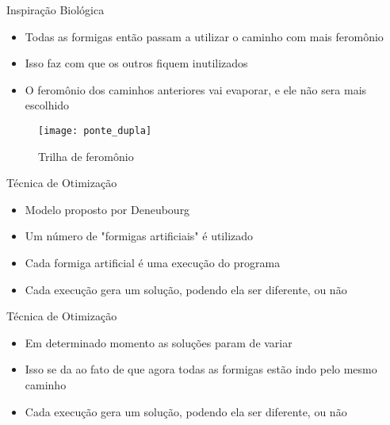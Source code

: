 \documentclass[compress]{beamer}
\begin{document}
\begin{frame}{Inspiração Biológica}
\begin{itemize}
\newline
\item{Todas as formigas então passam a utilizar o caminho com mais feromônio}
\newline
\item{Isso faz com que os outros fiquem inutilizados}
\newline
\item{O feromônio dos caminhos anteriores vai evaporar, e ele não sera mais escolhido}
\end{itemize}
\begin{figure}[!htb]
    \centering
\texttt{[image: ponte\_dupla]}
    \caption{Trilha de feromônio}
\end{figure}


\end{frame}


\begin{frame}{Técnica de Otimização}
\begin{itemize}
\item{Modelo proposto por Deneubourg}
\newline
\item{Um número de "formigas artificiais" é utilizado}
\newline
\item{Cada formiga artificial é uma execução do programa}
\newline
\item{Cada execução gera um solução, podendo ela ser diferente, ou não}
\end{itemize}
\end{frame}

\begin{frame}{Técnica de Otimização}
\begin{itemize}
\item{Em determinado momento as soluções param de variar}
\newline
\item{Isso se da ao fato de que agora todas as formigas estão indo pelo mesmo caminho}
\newline
\item{Cada execução gera um solução, podendo ela ser diferente, ou não}
\end{itemize}
\end{frame}
\end{document}
